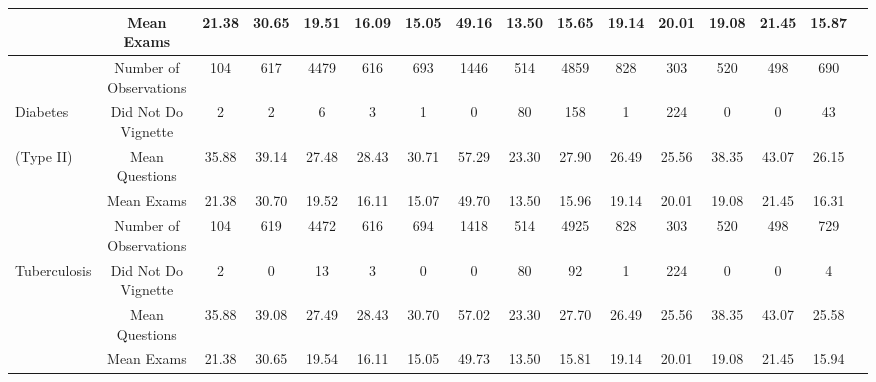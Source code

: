 \begin{tabular}{l*{15}{c}}
 &                                     {Mean Exams}&                           {21.38}&        {30.65}&    {19.51}&    {16.09}&        {15.05}&        {49.16}&        {13.50}&        {15.65}&        {19.14}&        {20.01}&       {19.08}&       {21.45}&       {15.87}\\
\hline
 &                                     {Number of Observations}&       {104}&        {617}&    {4479}&    {616}&        {693}&        {1446}&        {514}&        {4859}&        {828}&        {303}&       {520}&       {498}&       {690}\\
Diabetes&                      {Did Not Do Vignette}&          {2}&        {2}&    {6}&    {3}&        {1}&        {0}&            {80}&        {158}&        {1}&        {224}&        {0}&            {0}&            {43}\\
(Type II)&                     {Mean Questions}&                       {35.88}&        {39.14}&        {27.48}&    {28.43}&    {30.71}&        {57.29}&        {23.30}&        {27.90}&        {26.49}&        {25.56}&       {38.35}&       {43.07}&       {26.15}\\
 &                                     {Mean Exams}&                           {21.38}&        {30.70}&    {19.52}&    {16.11}&        {15.07}&        {49.70}&        {13.50}&        {15.96}&        {19.14}&        {20.01}&       {19.08}&       {21.45}&       {16.31}\\
\hline
 &                                     {Number of Observations}&       {104}&        {619}&    {4472}&    {616}&        {694}&        {1418}&        {514}&        {4925}&        {828}&        {303}&       {520}&       {498}&       {729}\\
Tuberculosis&          {Did Not Do Vignette}&          {2}&        {0}&            {13}&    {3}&    {0}&            {0}&            {80}&        {92}&        {1}&        {224}&        {0}&            {0}&            {4}\\
 &                                     {Mean Questions}&                       {35.88}&        {39.08}&    {27.49}&    {28.43}&        {30.70}&        {57.02}&        {23.30}&        {27.70}&        {26.49}&        {25.56}&       {38.35}&       {43.07}&       {25.58}\\
 &                                     {Mean Exams}&                           {21.38}&        {30.65}&    {19.54}&    {16.11}&        {15.05}&        {49.73}&        {13.50}&        {15.81}&        {19.14}&        {20.01}&       {19.08}&       {21.45}&       {15.94}\\

\end{tabular}
